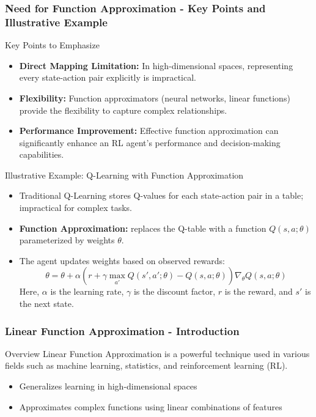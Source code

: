 \documentclass[aspectratio=169]{beamer}
\begin{document}
\begin{frame}[fragile]
    \frametitle{Need for Function Approximation - Key Points and Illustrative Example}
    \begin{block}{Key Points to Emphasize}
        \begin{itemize}
            \item \textbf{Direct Mapping Limitation:} In high-dimensional spaces, representing every state-action pair explicitly is impractical.
            \item \textbf{Flexibility:} Function approximators (neural networks, linear functions) provide the flexibility to capture complex relationships.
            \item \textbf{Performance Improvement:} Effective function approximation can significantly enhance an RL agent's performance and decision-making capabilities.
        \end{itemize}
    \end{block}
    
    \begin{block}{Illustrative Example: Q-Learning with Function Approximation}
        \begin{itemize}
            \item Traditional Q-Learning stores Q-values for each state-action pair in a table; impractical for complex tasks.
            \item \textbf{Function Approximation:} replaces the Q-table with a function \( Q(s, a; \theta) \) parameterized by weights \( \theta \).
            \item The agent updates weights based on observed rewards:
            \begin{equation}
                \theta = \theta + \alpha \left( r + \gamma \max_{a'} Q(s', a'; \theta) - Q(s, a; \theta) \right) \nabla_{\theta} Q(s, a; \theta)
            \end{equation}
            Here, \( \alpha \) is the learning rate, \( \gamma \) is the discount factor, \( r \) is the reward, and \( s' \) is the next state.
        \end{itemize}
    \end{block}
\end{frame}

\begin{frame}[fragile]
    \frametitle{Linear Function Approximation - Introduction}
    \begin{block}{Overview}
        Linear Function Approximation is a powerful technique used in various fields such as machine learning, statistics, and reinforcement learning (RL).
    \end{block}
    \begin{itemize}
        \item Generalizes learning in high-dimensional spaces
        \item Approximates complex functions using linear combinations of features
    \end{itemize}
\end{frame}
\end{document}
